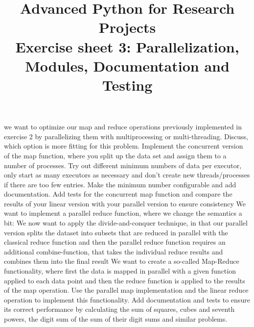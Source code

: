 \documentclass[]{erlangen-problemset}
\title{{\Large Advanced Python for Research Projects} \\[0.3cm] 
Exercise sheet 3: Parallelization, Modules, Documentation and Testing}
\begin{document}

\begin{problem}[title={Parallel operators}]
\noindent
\Question we want to optimize our map and reduce operations previously implemented in exercise 2 by parallelizing them with multiprocessing or multi-threading. Discuss, which option is more fitting for this problem.
\Question Implement the concurrent version of the map function, where you split up the data set and assign them to a number of processes. 
Try out different minimum numbers of data per executor, only start as many executors as necessary and don't create new threads/processes if there are too few entries. 
Make the minimum number configurable and add documentation. 
\Question Add tests for the concurrent map function and compare the results of your linear version with your parallel version to ensure consistency
\Question We want to implement a parallel reduce function, where we change the semantics a bit:
We now want to apply the divide-and-conquer technique, in that our parallel version splits the dataset into subsets that are reduced in parallel with the classical reduce function and then the parallel reduce function requires an additional combine-function, that takes the individual reduce results and combines them into the final result
\Question We want to create a so-called Map-Reduce functionality, where first the data is mapped in parallel with a given function applied to each data point and then the reduce function is applied to the results of the map operation. Use the parallel map implementation and the linear reduce operation to implement this functionality. 
Add documentation and tests to ensure its correct performance by calculating the sum of squares, cubes and seventh powers, the digit sum of the sum of their digit sums and similar problems.
\end{problem}
\end{document}
